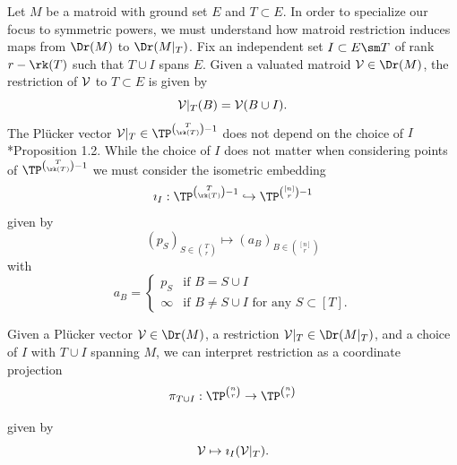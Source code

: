 Let $M$ be a matroid with ground set $E$ and $T\subset E$. In order to specialize our focus to symmetric powers, we must understand how matroid restriction induces maps from $\Dr(M)$ to $\Dr(M|_T)$. Fix an independent set $I\subset E\sm T$ of rank $r-\rk(T)$ such that $T\cup I$ spans $E$. Given a valuated matroid $\sV\in \Dr(M)$, the restriction of $\mathcal{V}$ to $T\subset E$ is given by
$$\mathcal{V}|_T(B) = \mathcal{V}(B\cup I).$$
The Pl\"ucker vector $\sV|_T\in \TP^{\binom{T}{\rk(T)}-1}$ does not depend on the choice of $I$ \cite{DW92}*{Proposition 1.2}. While the choice of $I$ does not matter when considering points of $\TP^{\binom{T}{\rk(T)}-1}$ we must consider the isometric embedding 
$$\imath_I:\TP^{\binom{T}{\rk(T)}-1}\hookrightarrow\TP^{\binom{[n]}{r}-1}$$ 
given by
 $$ (p_S)_{S\in\binom{T}{r}}\mapsto (a_B)_{B\in \binom{[n]}{r}} $$
 with
 $$a_B = \begin{cases}
 p_S & \text{if } B=S\cup I\\
 \infty & \text{if } B\neq S\cup I \text{ for any } S\subset [T].
 \end{cases}$$

 Given a Pl\"ucker vector $\sV\in \Dr(M)$, a restriction $\sV|_T\in \Dr(M|_{T})$, and a choice of $I$ with $T\cup I$ spanning $M$, we can interpret restriction as a coordinate projection 
 $$\pi_{T\cup I}: \TP^{\binom{n}{r}}\to \TP^{\binom{n}{r}}$$
 
 given by
$$\mathcal{V}\mapsto \imath_I(\mathcal{V}|_T).$$


